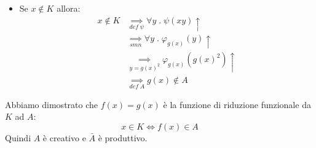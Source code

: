 \documentclass[a4paper]{article}
\begin{document}
\begin{exercise}
\begin{enumerate}
\begin{itemize}
        \item Se \( x \notin K \) allora:
          \[
            \begin{aligned}
              x \notin K &\underset{def\; \psi}{\implies} \forall y \;.\; \psi(xy)\uparrow\\
                         &\underset{smn}{\implies} \forall y \;.\; \varphi_{g(x)}(y) \uparrow\\
                         &\underset{y = g(x)^2}{\implies} \varphi_{g(x)}(g(x)^2) \uparrow\\
                         &\underset{def\; A}{\implies} g(x) \notin A
            \end{aligned}
          \]
      \end{itemize}
      Abbiamo dimostrato che \( f(x) = g(x) \) è la funzione di riduzione funzionale
      da \( K \) ad \( A \):
      \[
        x \in K \iff f(x) \in A
      \]
      Quindi \( A \) è creativo e \( \bar{A} \) è produttivo.
  \end{enumerate}
\end{exercise}
\end{document}
